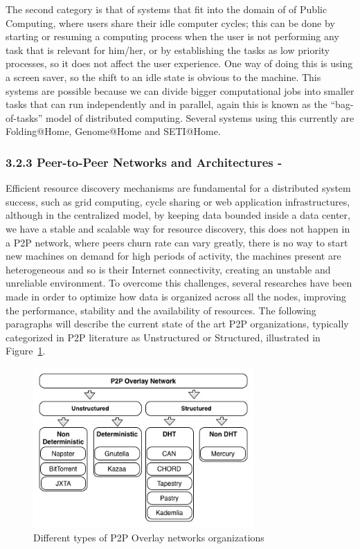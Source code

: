 The second category is that of systems that fit into the domain of of Public Computing, where users share their idle computer cycles; this can be done by starting or resuming a computing process when the user is not performing any task that is relevant for him/her, or by establishing the tasks as low priority processes, so it does not affect the user experience. One way of doing this is using a screen saver, so the shift to an idle state is obvious to the machine. This systems are possible because we can divide bigger computational jobs into smaller tasks that can run independently and in parallel, again this is known as the ``bag-of-tasks'' model of distributed computing. Several systems using this currently are Folding@Home, Genome@Home\cite{Larson2002} and SETI@Home\cite{Anderson2002}\cite{Korpela2001}.

\subsubsection{3.2.3 Peer-to-Peer Networks and Architectures -}  
Efficient resource discovery mechanisms are fundamental for a distributed system success, such as grid computing, cycle sharing or web application infrastructures\cite{Ranjan2006}, although in the centralized model, by keeping data bounded inside a data center, we have a stable and scalable way for resource discovery, this does not happen in a P2P network, where peers churn rate can vary greatly, there is no way to start new machines on demand for high periods of activity, the machines present are heterogeneous and so is their Internet connectivity, creating an unstable and unreliable environment. To overcome this challenges, several researches have been made in order to optimize how data is organized across all the nodes, improving the performance, stability and the availability of resources. The following paragraphs will describe the current state of the art P2P organizations, typically categorized in P2P literature as Unstructured or Structured\cite{Milojicic2003}, illustrated in Figure~\ref{fig:Different types of P2P Overlay networks organizations}.

\begin{figure}[bh!]
  \begin{center}
    \includegraphics[width=0.75\textwidth]{./img/p2porganizations.jpg}
  \end{center}
  \caption{Different types of P2P Overlay networks organizations}
  \label{fig:Different types of P2P Overlay networks organizations}
\end{figure}



